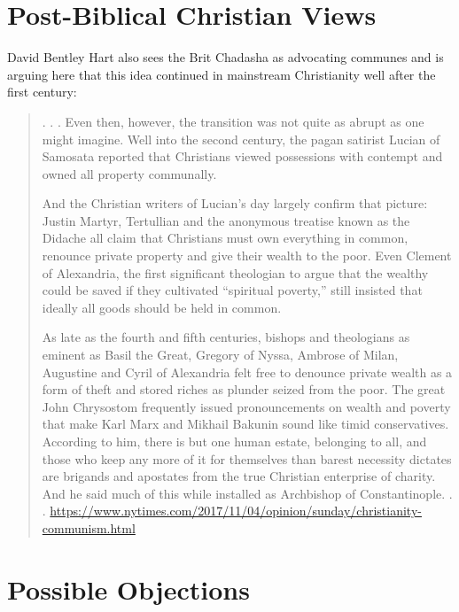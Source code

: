 \documentclass[11pt]{article}
\begin{document}
\section{Post-Biblical Christian Views}
David Bentley Hart also sees the Brit Chadasha as advocating communes and is arguing here that this idea continued in mainstream Christianity well after the first century:
\begin{quote}
. . . Even then, however, the transition was not quite as abrupt as one might imagine. Well into the second century, the pagan satirist Lucian of Samosata reported that Christians viewed possessions with contempt and owned all property communally. 

 And the Christian writers of Lucian’s day largely confirm that picture: Justin Martyr, Tertullian and the anonymous treatise known as the Didache all claim that Christians must own everything in common, renounce private property and give their wealth to the poor. Even Clement of Alexandria, the first significant theologian to argue that the wealthy could be saved if they cultivated “spiritual poverty,” still insisted that ideally all goods should be held in common.

As late as the fourth and fifth centuries, bishops and theologians as eminent as Basil the Great, Gregory of Nyssa, Ambrose of Milan, Augustine and Cyril of Alexandria felt free to denounce private wealth as a form of theft and stored riches as plunder seized from the poor. The great John Chrysostom frequently issued pronouncements on wealth and poverty that make Karl Marx and Mikhail Bakunin sound like timid conservatives. According to him, there is but one human estate, belonging to all, and those who keep any more of it for themselves than barest necessity dictates are brigands and apostates from the true Christian enterprise of charity. And he said much of this while installed as Archbishop of Constantinople. . .
\url{https://www.nytimes.com/2017/11/04/opinion/sunday/christianity-communism.html}
\end{quote}

\section{Possible Objections}
\end{document}
